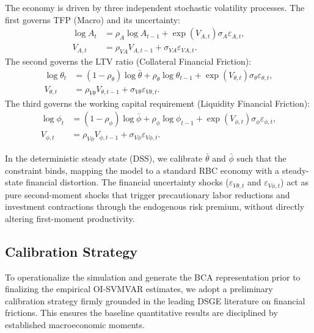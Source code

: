 The economy is driven by three independent stochastic volatility processes. The
first governs TFP (Macro) and its uncertainty:
\begin{align}
    \log A_t &= \rho_A \log A_{t-1} + \exp(V_{A,t})\sigma_A\varepsilon_{A,t},
    \label{eq:simulation_tfp} \\
    V_{A,t} &= \rho_{VA} V_{A,t-1} + \sigma_{VA}\varepsilon_{VA,t}.
    \label{eq:simulation_tfp_vol}
\end{align}
The second governs the LTV ratio (Collateral Financial Friction):
\begin{align}
    \log \theta_t &= (1-\rho_\theta)\log \bar{\theta} + \rho_\theta \log \theta_{t-1} + \exp(V_{\theta,t})\sigma_\theta\varepsilon_{\theta,t},
    \label{eq:simulation_theta} \\
    V_{\theta,t} &= \rho_{V\theta} V_{\theta,t-1} + \sigma_{V\theta}\varepsilon_{V\theta,t}.
    \label{eq:simulation_theta_vol}
\end{align}
The third governs the working capital requirement (Liquidity Financial Friction):
\begin{align}
    \log \phi_t &= (1-\rho_\phi)\log \bar{\phi} + \rho_\phi \log \phi_{t-1} + \exp(V_{\phi,t})\sigma_\phi\varepsilon_{\phi,t},
    \label{eq:simulation_phi} \\
    V_{\phi,t} &= \rho_{V\phi} V_{\phi,t-1} + \sigma_{V\phi}\varepsilon_{V\phi,t}.
    \label{eq:simulation_phi_vol}
\end{align}

In the deterministic steady state (DSS), we calibrate \(\bar{\theta}\) and \(\bar{\phi}\)
such that the constraint binds, mapping the model to a standard RBC economy with
a steady-state financial distortion. The financial uncertainty shocks (\(\varepsilon_{V\theta,t}\)
and \(\varepsilon_{V\phi,t}\)) act as pure second-moment shocks that trigger precautionary
labor reductions and investment contractions through the endogenous risk premium,
without directly altering first-moment productivity.

\subsection{Calibration Strategy}

To operationalize the simulation and generate the BCA representation prior to
finalizing the empirical OI-SVMVAR estimates, we adopt a preliminary calibration
strategy firmly grounded in the leading DSGE literature on financial frictions.
This ensures the baseline quantitative results are disciplined by established
macroeconomic moments.

